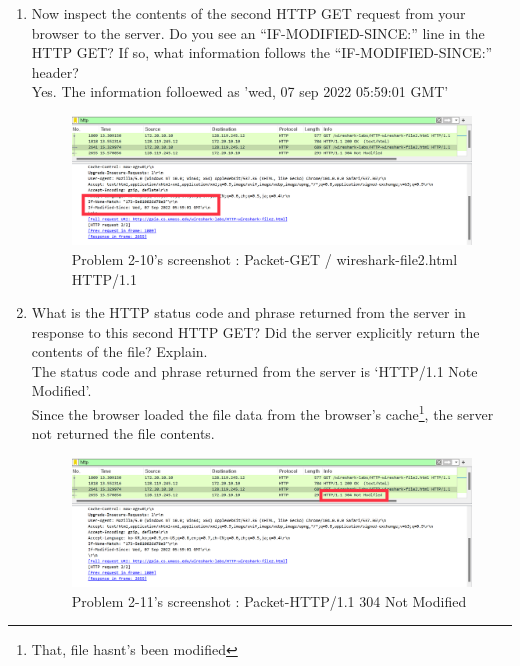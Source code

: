 \begin{enumerate}[label=\bfseries Problem \arabic*:,leftmargin=*,labelindent=1em]
\begin{figure}[!h]
        		\caption{\footnotesize Problem 2-9's screenshot : Packet-HTTP/1.1 200 OK}
        		\vspace{-10pt}
            \end{figure}           
        \item Now inspect the contents of the second HTTP GET request from your browser to the server. Do you see an “IF-MODIFIED-SINCE:” line in the HTTP GET? If so, what information follows the “IF-MODIFIED-SINCE:” header?\\[0.2mm]
            \soln Yes. The information folloewed as 'wed, 07 sep 2022 05:59:01 GMT'
            \begin{figure}[!h]\centering
        		\includegraphics[width=.78\textwidth]{image/result_week01/Q2-a.png}
        		\caption{\footnotesize Problem 2-10's screenshot : Packet-GET / wireshark-file2.html HTTP/1.1}
        		\vspace{-10pt}
            \end{figure}           
        \item What is the HTTP status code and phrase returned from the server in response to this second HTTP GET? Did the server explicitly return the contents of the file? Explain.\\[0.2mm]
            \soln The status code and phrase returned from the server is ‘HTTP/1.1 Note Modified’.\\
            Since the browser loaded the file data from the browser’s cache\footnote{That, file hasnt’s been modified},
            the server not returned the file contents.
\newpage
            \vspace{-2mm}  
            \begin{figure}[!h]\centering
        		\includegraphics[width=.79\textwidth]{image/result_week01/Q2-b.png}
        		\caption{\footnotesize Problem 2-11's screenshot : Packet-HTTP/1.1 304 Not Modified}
        		\vspace{-10pt}
            \end{figure}            
    \end{enumerate}
